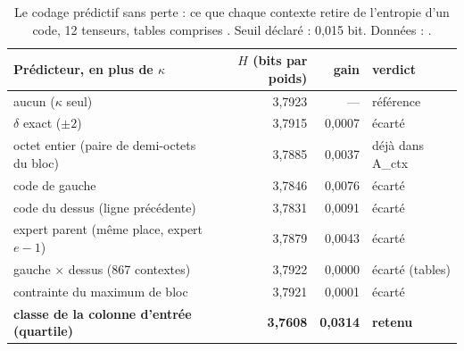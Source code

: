 \begin{table}[tbp]
\centering\small
\begin{tabular}{l r r l}
\toprule
Prédicteur, en plus de $\kappa$ & $H$ (bits par poids) & gain & verdict \\
\midrule
aucun ($\kappa$ seul) & 3,7923 & — & référence \\
$\delta$ exact ($\pm 2$) & 3,7915 & 0,0007 & écarté \\
octet entier (paire de demi-octets du bloc) & 3,7885 & 0,0037 & déjà dans A\_ctx \\
code de gauche & 3,7846 & 0,0076 & écarté \\
code du dessus (ligne précédente) & 3,7831 & 0,0091 & écarté \\
expert parent (même place, expert $e - 1$) & 3,7879 & 0,0043 & écarté \\
gauche $\times$ dessus (867 contextes) & 3,7922 & 0,0000 & écarté (tables) \\
contrainte du maximum de bloc & 3,7921 & 0,0001 & écarté \\
\textbf{classe de la colonne d'entrée (quartile)} & \textbf{3,7608} & \textbf{0,0314} & \textbf{retenu} \\
\bottomrule
\end{tabular}
\caption[Ce que les voisins disent d'un code]{Le codage prédictif sans perte : ce que chaque contexte retire de l'entropie d'un code, 12 tenseurs, tables comprises \mes. Seuil déclaré : 0,015 bit. Données : .}
\label{t3pre:tab:contextes}
\end{table}

